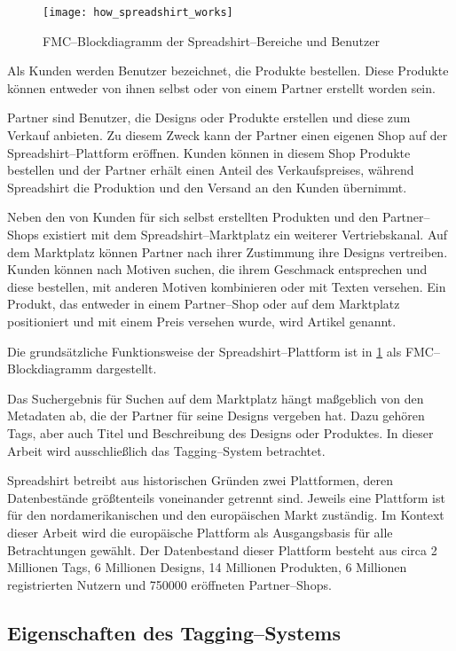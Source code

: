 \begin{figure}
\centering
\texttt{[image: how\_spreadshirt\_works]}
\caption{FMC--Blockdiagramm der Spreadshirt--Bereiche und Benutzer}
\label{fig:howspreadshirtworks}
\end{figure}

Als Kunden werden Benutzer bezeichnet, die Produkte bestellen. Diese Produkte können entweder von ihnen selbst oder von einem Partner erstellt worden sein. 

Partner sind Benutzer, die Designs oder Produkte erstellen und diese zum Verkauf anbieten. Zu diesem Zweck kann der Partner einen eigenen Shop auf der Spreadshirt--Plattform eröffnen. Kunden können in diesem Shop Produkte bestellen und der Partner erhält einen Anteil des Verkaufspreises, während Spreadshirt die Produktion und den Versand an den Kunden übernimmt.

Neben den von Kunden für sich selbst erstellten Produkten und den Partner--Shops existiert mit dem Spreadshirt--Marktplatz ein weiterer Vertriebskanal. Auf dem Marktplatz können Partner nach ihrer Zustimmung ihre Designs vertreiben. Kunden können nach Motiven suchen, die ihrem Geschmack entsprechen und diese bestellen, mit anderen Motiven kombinieren oder mit Texten versehen. Ein Produkt, das entweder in einem Partner--Shop oder auf dem Marktplatz positioniert und mit einem Preis versehen wurde, wird Artikel genannt.

Die grundsätzliche Funktionsweise der Spreadshirt--Plattform ist in \cref{fig:howspreadshirtworks} als FMC--Blockdiagramm dargestellt.

Das Suchergebnis für Suchen auf dem Marktplatz hängt maßgeblich von den Metadaten ab, die der Partner für seine Designs vergeben hat. Dazu gehören Tags, aber auch Titel und Beschreibung des Designs oder Produktes. In dieser Arbeit wird ausschließlich das Tagging--System betrachtet.

\label{platforms}
Spreadshirt betreibt aus historischen Gründen zwei Plattformen, deren Datenbestände größtenteils voneinander getrennt sind. Jeweils eine Plattform ist für den nordamerikanischen und den europäischen Markt zuständig. Im Kontext dieser Arbeit wird die europäische Plattform als Ausgangsbasis für alle Betrachtungen gewählt. Der Datenbestand dieser Plattform besteht aus circa 2 Millionen Tags, 6 Millionen Designs, 14 Millionen Produkten, 6 Millionen registrierten Nutzern und \num{750000} eröffneten Partner--Shops.

\subsection{Eigenschaften des Tagging--Systems}
\label{tag_sprd}

